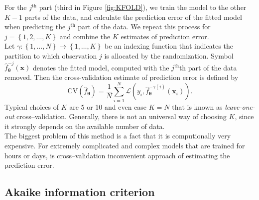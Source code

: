 For the $j^{\mathrm{th}}$ part (third in Figure \ref{fig:KFOLD}), we train the model to the other $K-1$ parts
of the data, and calculate the prediction error of the fitted model when
predicting the $j^{\mathrm{th}}$ part of the data. We repeat this process for $j = \left\lbrace 1,2,\dots,K\right\rbrace$ and
combine the $K$ estimates of prediction error.\\
Let $\gamma : \left\lbrace 1,\dots,N\right\rbrace\rightarrow  \left\lbrace 1,\dots,K\right\rbrace$ be an indexing
function that indicates the partition to which observation $j$ is allocated by
the randomization. Symbol $\hat{f}_{\boldsymbol{\theta}}^{-j}\left(\boldsymbol{x}\right)$ denotes the fitted model, computed with
the $j^{\mathrm{th}}$th part of the data removed. Then the cross-validation estimate of
prediction error is defined by
\begin{equation}
\mathrm{CV}\left(\hat{f}_{\boldsymbol{\theta}}\right) = \frac{1}{N}\sum_{i = 1}^{N}\mathcal{L}\left(y_i , \hat{f}_{\boldsymbol{\theta}}^{-\gamma\left(i\right)}\left(\boldsymbol{x}_i\right)\right).
\end{equation}
Typical choices of $K$ are 5 or 10 and even case $K = N$ that is known as \emph{leave-one-out} cross--validation. Generally, there is not an universal way of choosing $K$, since it strongly depends on the available number of data. \\
The biggest problem of this method is a fact that it is computionally very expensive. For extremely complicated and complex models that are trained for hours or days, is cross--validation inconvenient approach of estimating the prediction error.
\subsection{Akaike information criterion}



